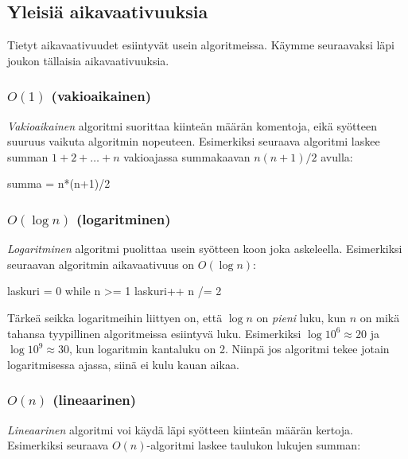 \subsection{Yleisiä aikavaativuuksia}

Tietyt aikavaativuudet esiintyvät usein algoritmeissa.
Käymme seuraavaksi läpi joukon tällaisia aikavaativuuksia.


\subsubsection{$O(1)$ (vakioaikainen)}

\emph{Vakioaikainen} algoritmi suorittaa kiinteän määrän komentoja,
eikä syötteen suuruus vaikuta algoritmin nopeuteen.
Esimerkiksi seuraava algoritmi laskee summan $1+2+\dots+n$
vakioajassa summakaavan $n(n+1)/2$ avulla:

\begin{code}
summa = n*(n+1)/2
\end{code}


\subsubsection{$O(\log n)$ (logaritminen)}

\emph{Logaritminen} algoritmi puolittaa usein syötteen koon
joka askeleella.
Esimerkiksi seuraavan algoritmin aikavaativuus on $O(\log n)$:

\begin{code}
laskuri = 0
while n >= 1
    laskuri++
    n /= 2
\end{code}

Tärkeä seikka logaritmeihin liittyen on, että
$\log n$ on \emph{pieni} luku, kun $n$ on mikä tahansa 
tyypillinen algoritmeissa esiintyvä luku.
Esimerkiksi $\log 10^6 \approx 20$ ja $\log 10^9 \approx 30$,
kun logaritmin kantaluku on 2.
Niinpä jos algoritmi tekee jotain logaritmisessa ajassa,
siinä ei kulu kauan aikaa.


\subsubsection{$O(n)$ (lineaarinen)}

\emph{Lineaarinen} algoritmi voi käydä läpi syötteen kiinteän määrän kertoja.
Esimerkiksi seuraava $O(n)$-algoritmi laskee taulukon lukujen summan:

